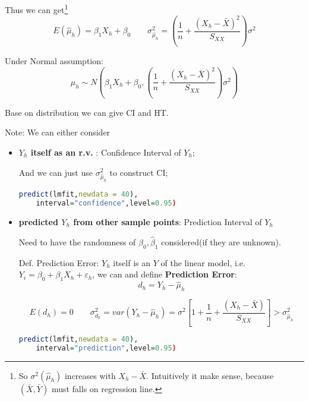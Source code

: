     Thus we can get\footnote{So $ \sigma ^2(\hat{\mu }_h) $ increases with $ X_h-\bar{X} $. Intuitively it make sense, because $ (\bar{X},\bar{Y})$ must falls on regression line.}
    \begin{equation}
        E(\hat{\mu}_h)= \beta _1X_h+\beta _0\qquad \sigma ^2_{\hat{\mu}_h}=\left( \dfrac{1}{n}+\dfrac{(X_h-\bar{X})^2}{S_{XX}} \right)\sigma^2
    \end{equation}
    
    Under Normal assumption:
    \begin{equation}
        \hat{\mu}_h\sim N(\beta _1X_h+\beta _0,\left( \dfrac{1}{n}+\dfrac{(X_h-\bar{X})^2}{S_{XX}} \right)\sigma^2) 
    \end{equation}
    
    Base on distribution we can give CI and HT.

    Note: We can either consider 
    \begin{itemize}[topsep=2pt,itemsep=2pt]
        \item \textbf{$ Y_h $ itself as an r.v. }: Confidence Interval of $ Y_h $;
        
        And we can just use $  \sigma ^2_{\hat{\mu}_h} $ to construct CI;

        \begin{rcode}
\begin{lstlisting}[language=R]
predict(lmfit,newdata = 40),
    interval="confidence",level=0.95)
\end{lstlisting}
        \end{rcode}
        \item \textbf{predicted $ Y_h $ from other sample points}: Prediction Interval of $ Y_h $
        
        Need to  have the randomness of $ \hat{\beta }_0,\hat{\beta }_1 $ considered(if they are unknown).

        Def. Prediction Error: $ Y_h $ itself is an $ Y $ of the linear model, i.e. $ Y_i=\beta_0+\beta_1X_h+\varepsilon _h $, we can  and define \textbf{Prediction Error}: 
        \begin{equation}
            d_h=Y_h-\hat{\mu}_h 
        \end{equation}
    
        
        \begin{equation}
            E(d_h)=0\qquad \sigma^2_{d_h}=var(Y_h-\hat{\mu }_h)=\sigma^2\left[ 1+\dfrac{1}{n}+\dfrac{(X_h-\bar{X})}{S_{XX}} \right] > \sigma ^2_{\hat{\mu}_h}
        \end{equation}
\begin{rcode}
\begin{lstlisting}[language=R]
predict(lmfit,newdata = 40),
    interval="prediction",level=0.95)
\end{lstlisting}
\end{rcode}
    
    \end{itemize}
    
